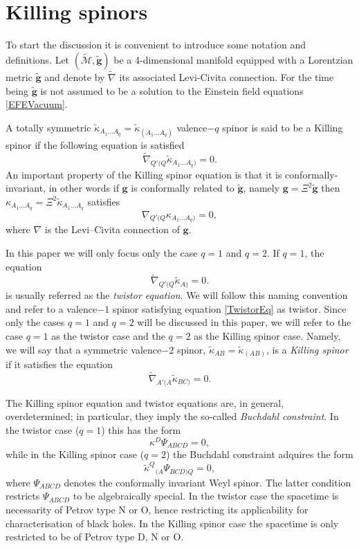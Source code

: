 \documentclass[10pt,a4paper]{article}
\theoremstyle{plain}
\def\bmg{{\bm g}}
\begin{document}
\section{Killing spinors}\label{Sec:KillingSpinors}

To start the discussion it is convenient to introduce some notation
and definitions. Let $(\tilde{\mathcal{M}},\tilde{\bmg})$ be a
4-dimensional manifold equipped with a Lorentzian metric
$\tilde{\bmg}$ and denote by $\tilde{\nabla}$ its associated
Levi-Civita connection.  For the time being $\tilde{\bmg}$ is not
assumed to be a solution to the Einstein field equations
\eqref{EFEVacuum}.

{\color{blue}
A totally symmetric
$\tilde{\kappa}_{A_1...A_q}=\tilde{\kappa}_{(A_1...A_q)}$ valence$-q$
spinor is said to be a Killing spinor if the following equation is
satisfied
\begin{equation}\label{qValenceKillingspinor}
\tilde{\nabla}_{Q'(Q}\tilde{\kappa}_{A_1...A_q)}=0.
\end{equation}
An important property of the Killing spinor equation is that it is
conformally-invariant, in other words if $\bmg$ is conformally related
to $\tilde{\bmg}$, namely $\bmg=\Xi^2\tilde{\bmg}$ then
${\kappa}_{A_1...A_q}=\Xi^2 \tilde{\kappa}_{A_1...A_q}$ satisfies
\[{\nabla}_{Q'(Q}{\kappa}_{A_1...A_q)}=0,\]
where ${\nabla}$ is the Levi--Civita connection of ${\bmg}$.

\medskip
\noindent In this paper we will only focus only the case $q=1$ and $q=2$.
If $q=1$, the equation
\begin{equation}\label{TwistorEq}
  \tilde{\nabla}_{Q'(Q}\tilde{\kappa}_{A)}=0.
\end{equation}
is usually referred as the \emph{twistor equation}. We will follow
this naming convention and refer to a valence$-1$ spinor
 satisfying equation \eqref{TwistorEq} as twistor.
Since only the cases $q=1$ and $q=2$ will be discussed in this paper, we will refer
to the case $q=1$ as the twistor case and the $q=2$ as the Killing
spinor case. Namely, we will say that a symmetric valence$-2$ spinor, $\tilde{\kappa}_{AB}=
\tilde{\kappa}_{(AB)}$, is a \textit{Killing spinor} if it satisfies
the equation
\begin{equation}
\tilde{\nabla}_{A'(A}\tilde{\kappa}_{BC)}=0.
\end{equation}

The Killing spinor equation and twistor equations are, in general, overdetermined;
in particular, they imply the so-called \textit{Buchdahl constraint}.
In the twistor case ($q=1$) this has the form
\[
\kappa^D\Psi_{ABCD}=0,
\]
while in the Killing spinor case ($q=2$) the Buchdahl constraint adquires the
form
\[
\tilde{\kappa}^Q{}_{(A}\Psi_{BCD)Q}=0,
\]
where $\Psi_{ABCD}$ denotes the conformally invariant Weyl spinor.
The latter condition restricts $\Psi_{ABCD}$ to be algebraically
special.  In the twistor case the spacetime is necessarity of Petrov
type N or O, hence restricting its applicability for characterisation of
black holes.  In the Killing spinor case the spacetime is only
restricted to be of Petrov type D, N or O.

}
\end{document}
